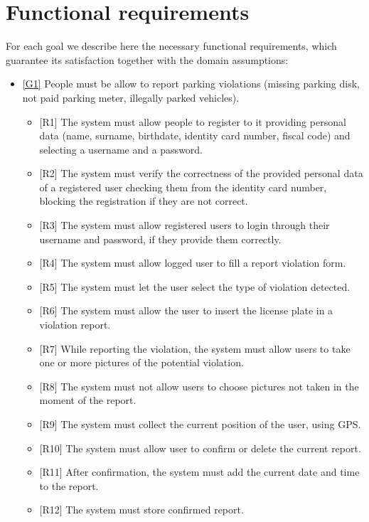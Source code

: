 \documentclass[a4paper]{report}
\begin{document}
\section{Functional requirements}
\label{sec:fun-requirements} 
For each goal we describe here the necessary functional requirements, which guarantee its satisfaction together with the domain assumptions:
\begin{itemize}
\item \hyperref[G1]{[G1]} People must be allow to report parking violations (missing parking disk, not paid parking meter, illegally parked vehicles).
\begin{itemize}
\item {[R1]}	\label{R1}The system must allow people to register to it providing personal data (name, surname, birthdate, identity card number, fiscal code) and selecting a username and a password.
\item {[R2]}	\label{R2}The system must verify the correctness of the provided personal data of a registered user checking them from the identity card number, blocking the registration if they are not correct.
\item {[R3]}	\label{R3}The system must allow registered users to login through their username and password, if they provide them correctly. 
\item {[R4]}	\label{R4}The system must allow logged user to fill a report violation form.
\item {[R5]}	\label{R5}The system must let the user select the type of violation detected.
\item {[R6]}	\label{R6}The system must allow the user to insert the license plate in a violation report.
\item {[R7]}	\label{R7}While reporting the violation, the system must allow users to take one or more pictures of the potential violation.
\item {[R8]}	\label{R8}The system must not allow users to choose pictures not taken in the moment of the report.
\item {[R9]}	\label{R9}The system must collect the current position of the user, using GPS.
\item {[R10]}	\label{R10}The system must allow user to confirm or delete the current report.
\item {[R11]}	\label{R11}After confirmation, the system must add the current date and time to the report.
\item {[R12]}	\label{R12}The system must store confirmed report.

\end{itemize}
\end{itemize}
\end{document}
